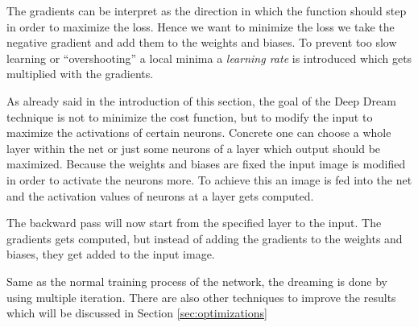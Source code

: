 The gradients can be interpret as the direction in which the function should step in order to maximize the loss.
Hence we want to minimize the loss we take the negative gradient and add them to the weights and biases.
To prevent too slow learning or \enquote{overshooting} a local minima a \emph{learning rate} is introduced which gets multiplied with the gradients.

As already said in the introduction of this section, the goal of the Deep Dream technique is not to minimize the cost function, but to modify the input to maximize the activations of certain neurons.
Concrete one can choose a whole layer within the net or just some neurons of a layer which output should be maximized.
Because the weights and biases are fixed the input image is modified in order to activate the neurons more.
To achieve this an image is fed into the net and the activation values of neurons at a layer gets computed.


The backward pass will now start from the specified layer to the input.
The gradients gets computed, but instead of adding the gradients to the weights and biases, they get added to the input image.



Same as the normal training process of the network, the dreaming is done by using multiple iteration.
There are also other techniques to improve the results which will be discussed in Section \ref{sec:optimizations}











